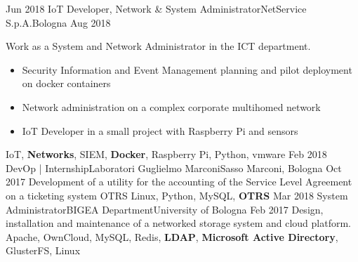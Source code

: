 %
%
%

\begin{experiences}
  \experience
  {Jun 2018} {IoT Developer, Network \& System Administrator}{NetService S.p.A.}{Bologna}
  {Aug 2018}    {
                    Work as a System and Network Administrator in the ICT department.
                    \begin{itemize}
                      \item Security Information and Event Management planning and pilot deployment on docker containers
                      \item Network administration on a complex corporate multihomed network 
                      \item IoT Developer in a small project with Raspberry Pi and sensors
                    \end{itemize}
                  }
                  {IoT, \textbf{Networks}, SIEM, \textbf{Docker}, Raspberry Pi, Python, vmware}
\emptySeparator
  \experience
    {Feb 2018} {DevOp | Internship}{Laboratori Guglielmo Marconi}{Sasso Marconi, Bologna}
    {Oct 2017}    {
                      Development of a utility for the accounting of the Service Level Agreement on a ticketing system OTRS
                    }
                    {Linux, Python, MySQL, \textbf{OTRS}}
  \emptySeparator
  \experience
    {Mar 2018}   {System Administrator}{BIGEA Department}{University of Bologna}
    {Feb 2017} {
                    Design, installation and maintenance of a networked storage system and cloud platform.
                    }
                    {Apache, OwnCloud, MySQL, Redis, \textbf{LDAP}, \textbf{Microsoft Active Directory}, GlusterFS, Linux}
\emptySeparator
\end{experiences}